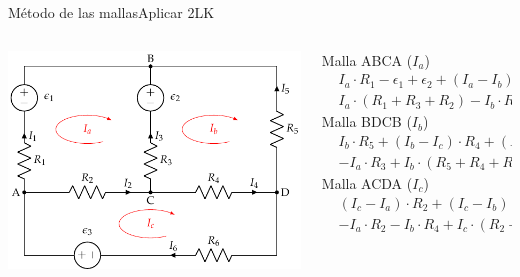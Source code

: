 \documentclass[aspectratio=169, xcolor={usenames,svgnames,dvipsnames}]{beamer}
\begin{document}
\begin{frame}{Método de las mallas}{Aplicar 2LK}
\begin{columns}
\begin{column}{0.4\columnwidth}
\begin{center}
\includegraphics[height=0.45\textheight]{../figs/mallas1_corrientes.pdf}
\end{center}
\end{column}
\begin{column}{0.6\linewidth}
Malla ABCA ($I_a$)
\begin{align*}
  &I_a \cdot R_1 - \epsilon_1 + \epsilon_2 + (I_a - I_b) \cdot R_3 + (I_a - I_c) \cdot R_2 = 0\\
  &I_a \cdot (R_1 + R_3 + R_2)  - I_b\cdot R_3 - I_c \cdot R_2 = \epsilon_1 - \epsilon_2
\end{align*}
Malla BDCB ($I_b$)
\begin{align*}
 & I_b \cdot R_5 + (I_b - I_c) \cdot R_4 + (I_b - I_a) \cdot R_3 - \epsilon_2 = 0\\
&  - I_a \cdot R_3 + I_b \cdot (R_5 + R_4 + R_3) - I_c \cdot R_4 =  \epsilon_2
\end{align*}
Malla ACDA ($I_c$)
\begin{align*}
  &(I_c - I_a) \cdot R_2 + (I_c - I_b) \cdot R_4 + I_c \cdot R_6 - \epsilon_3 = 0\\
  &- I_a \cdot R_2 - I_b \cdot R_4 + I_c \cdot (R_2 + R_4 + R_6) = \epsilon_3
\end{align*}
\end{column}
\end{columns}
\end{frame}
\end{document}
